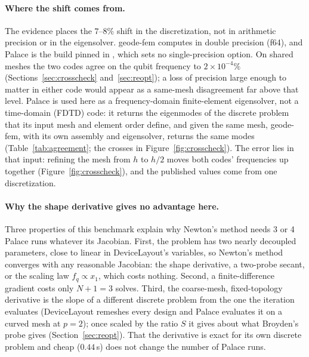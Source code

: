 \documentclass{anvil-paper}
\begin{document}
\paragraph{Where the shift comes from.}
The evidence places the $7$--$8\%$ shift in the discretization, not in
arithmetic precision or in the eigensolver. geode-fem computes in double
precision (f64), and Palace is the build pinned in
, which sets no single-precision
option. On shared meshes the two codes agree on the qubit frequency to
$2\times10^{-4}\%$ (Sections~\ref{sec:crosscheck} and~\ref{sec:reopt});
a loss of precision large enough to matter in either code would appear as
a same-mesh disagreement far above that level. Palace is used here as a
frequency-domain finite-element eigensolver, not a time-domain (FDTD)
code: it returns the eigenmodes of the discrete problem that its input
mesh and element order define, and given the same mesh, geode-fem, with
its own assembly and eigensolver, returns the same modes
(Table~\ref{tab:agreement}; the crosses in Figure~\ref{fig:crosscheck}).
The error lies in that input: refining the mesh from $h$ to $h/2$ moves
both codes' frequencies up together (Figure~\ref{fig:crosscheck}), and
the published values come from one discretization.

\paragraph{Why the shape derivative gives no advantage here.}
Three properties of this benchmark explain why Newton's method needs 3
or 4 Palace runs whatever its Jacobian. First, the problem has
two nearly decoupled parameters, close to linear in DeviceLayout's
variables, so Newton's method converges with any reasonable Jacobian: the
shape derivative, a two-probe secant, or the scaling law $f_q \propto x_1$,
which costs nothing. Second, a finite-difference gradient costs only $N+1 =
3$ solves. Third, the coarse-mesh, fixed-topology derivative is the slope
of a different discrete problem from the one the iteration evaluates
(DeviceLayout remeshes every design and Palace evaluates it on a curved
mesh at $p = 2$); once scaled by the ratio $S$ it gives about what
Broyden's probe gives (Section~\ref{sec:reopt}). That the derivative is exact for its own
discrete problem and cheap ($0.44$\,s) does not change the number of
Palace runs.
\end{document}
